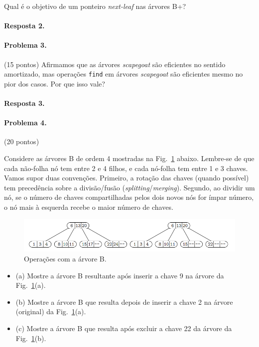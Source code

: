 \documentclass{article}
\begin{document}
Qual é o objetivo de um ponteiro \textit{next-leaf} nas árvores B+?

\paragraph{Resposta 2.}

\paragraph{Problema 3.} (15 pontos) 
Afirmamos que as árvores \textit{scapegoat} são eficientes no sentido amortizado, mas operações \texttt{find} em árvores \textit{scapegoat} são eficientes mesmo no pior dos casos. Por que isso vale?

\paragraph{Resposta 3.}

\paragraph{Problema 4.} (20 pontos)

Considere as árvores B de ordem 4 mostradas na Fig.~\ref{fig:prob4} abaixo. Lembre-se de que cada não-folha
nó tem entre 2 e 4 filhos, e cada nó-folha tem entre 1 e 3 chaves. Vamos supor
duas convenções. Primeiro, a rotação das chaves (quando possível) tem precedência sobre a divisão/fusão (\textit{splitting}/\textit{merging}).
Segundo, ao dividir um nó, se o número de chaves compartilhadas pelos dois novos nós for ímpar
número, o nó mais à esquerda recebe o maior número de chaves.

\begin{figure}[h]
    \centering
    \includegraphics[width = 0.8\linewidth]{fig1.png}
    \caption{Operações com a árvore B.}
    \label{fig:prob4}
\end{figure}

\begin{itemize}
    \item (a) Mostre a árvore B resultante após inserir a chave 9 na árvore da Fig.~\ref{fig:prob4}(a).
\item (b) Mostre a árvore B que resulta depois de inserir a chave 2 na árvore (original) da Fig.~\ref{fig:prob4}(a).
\item (c) Mostre a árvore B que resulta após excluir a chave 22 da árvore da Fig.~\ref{fig:prob4}(b).
\end{itemize}
\end{document}
